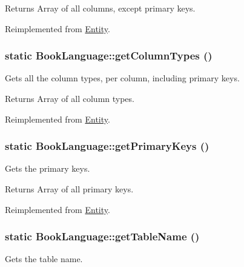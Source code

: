 \begin{DoxyReturn}{Returns}
Array of all columns, except primary keys. 
\end{DoxyReturn}


Reimplemented from \hyperlink{classEntity_a394717a08ffd54ec9a14d06727c86719}{Entity}.

\hypertarget{classBookLanguage_a3ec4af1722ff86f65464a563f7c21d12}{
\subsubsection[{getColumnTypes}]{\setlength{\rightskip}{0pt plus 5cm}static BookLanguage::getColumnTypes ()}}
\label{classBookLanguage_a3ec4af1722ff86f65464a563f7c21d12}
Gets all the column types, per column, including primary keys.

\begin{DoxyReturn}{Returns}
Array of all column types. 
\end{DoxyReturn}


Reimplemented from \hyperlink{classEntity_ad69437219c10955803707fbf6ac458e7}{Entity}.

\hypertarget{classBookLanguage_a2efcb1546e54019661200ad14276c5b6}{
\subsubsection[{getPrimaryKeys}]{\setlength{\rightskip}{0pt plus 5cm}static BookLanguage::getPrimaryKeys ()}}
\label{classBookLanguage_a2efcb1546e54019661200ad14276c5b6}
Gets the primary keys.

\begin{DoxyReturn}{Returns}
Array of all primary keys. 
\end{DoxyReturn}


Reimplemented from \hyperlink{classEntity_a61bbfbb4058427174e002a09ddc77c41}{Entity}.

\hypertarget{classBookLanguage_a755bc7ed42e5d959d88a387485279ebd}{
\subsubsection[{getTableName}]{\setlength{\rightskip}{0pt plus 5cm}static BookLanguage::getTableName ()}}
\label{classBookLanguage_a755bc7ed42e5d959d88a387485279ebd}
Gets the table name.

